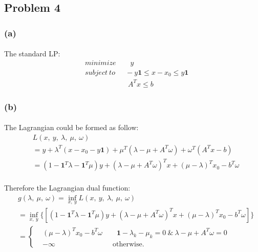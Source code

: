 \documentclass[12pt]{article}
\begin{document}
\subsection*{Problem 4}
\subsubsection*{(a)}
\paragraph*{}
The standard LP:
\begin{align*}
&minimize  \qquad y\\\
&subject \ to \quad  \ \ -y \textbf{1} \leq x - x_0 \leq y \textbf{1}\\
&\qquad \qquad \qquad A^T x \leq b
\end{align*}
%
\subsubsection*{(b)}
\paragraph*{}
The Lagrangian could be formed as follow:
\begin{align*}
& L(x,\ y,\ \lambda,\ \mu, \ \omega)  \\
& = y + \lambda^T(x - x_0 - y \textbf{1}) + \mu^T(\lambda - \mu + A^T\omega) +\omega^T(A^T x -b)\\
& = (1-\textbf{1}^T \lambda - \textbf{1}^T \mu)y + (\lambda - \mu +A^T\omega)^T x +(\mu - \lambda)^T x_0 -b^T \omega
\end{align*}
%
\paragraph*{}
Therefore the Lagrangian dual function:
\begin{align*}
& g(\lambda, \ \mu, \ \omega) = \inf_{x,\ y} L(x,\ y, \ \lambda,\ \mu, \ \omega)\\
& = \inf_{x,\ y} \{[(1-\textbf{1}^T \lambda - \textbf{1}^T \mu)y + (\lambda - \mu +A^T\omega)^T x +(\mu - \lambda)^T x_0 -b^T \omega]\}\\
&= \begin{cases}
&(\mu - \lambda)^T x_0 -b^T \omega \quad \quad \textbf{1} - \lambda_k - \mu_k = 0 \ \& \ \lambda - \mu +A^T\omega  = 0\\
&-\infty  \qquad  \qquad \qquad \qquad \text{otherwise}.
\end{cases}
\end{align*}
%
\end{document}
